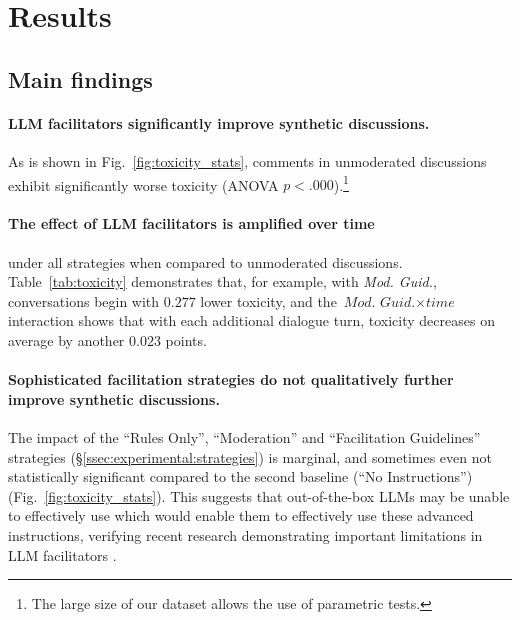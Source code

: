 %

\section{Results}
\label{sec:results}


\subsection{Main findings}

\paragraph{\ac{LLM} facilitators significantly improve synthetic discussions.} As is shown in Fig.~\ref{fig:toxicity_stats}, comments in unmoderated discussions exhibit significantly worse toxicity (ANOVA $p<.000$).\footnote{The large size of our dataset allows the use of parametric tests.} 

\paragraph{The effect of \ac{LLM} facilitators is amplified over time} under all strategies when compared to unmoderated discussions. Table~\ref{tab:toxicity} demonstrates that, for example, with \textit{Mod. Guid.}, conversations begin with $0.277$ lower toxicity, and the $\textit{Mod. Guid.} \times \textit{time}$ interaction shows that with each additional dialogue turn, toxicity decreases on average by another $0.023$ points.

\paragraph{Sophisticated facilitation strategies do not qualitatively further improve synthetic discussions.} The impact of the ``Rules Only'', ``Moderation'' and ``Facilitation Guidelines''  strategies (\S\ref{ssec:experimental:strategies}) is marginal, and sometimes even not statistically significant compared to the second baseline (``No Instructions'') (Fig.~\ref{fig:toxicity_stats}). This suggests that out-of-the-box \acp{LLM} may be unable to effectively use which would enable them to effectively use these advanced instructions, verifying recent research demonstrating important limitations in \ac{LLM} facilitators \cite{cho-etal-2024-language}. %

